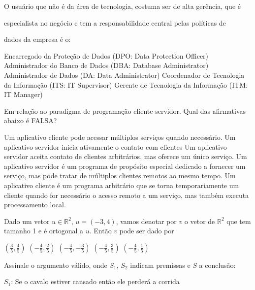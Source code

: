 \documentclass[12pt, addpoints]{exam}
\begin{document}
\begin{questions}
\question

O usuário que não é da área de tecnologia, costuma ser de alta gerência, que é

especialista no negócio e tem a responsabilidade central pelas políticas de

dados da empresa é o:
\begin{choices}
\choice Encarregado da Proteção de Dados (DPO: Data Protection Officer)
\choice Administrador do Banco de Dados (DBA: Database Administrator)
\choice Administrador de Dados (DA: Data Administrator)
\choice Coordenador de Tecnologia da Informação (ITS: IT Supervisor)
\choice Gerente de Tecnologia da Informação (ITM: IT Manager)
\end{choices}

\question

Em relação ao paradigma de programação cliente-servidor. Qual das afirmativas abaixo é FALSA?
\begin{choices}
\choice Um aplicativo cliente pode acessar múltiplos serviços quando necessário.
\choice Um aplicativo servidor inicia ativamente o contato com clientes 
\choice Um aplicativo servidor aceita contato de clientes arbitrários, mas oferece um único serviço. 
\choice Um aplicativo servidor é um programa de propósito especial dedicado a fornecer um serviço, mas pode tratar de múltiplos clientes remotos ao mesmo tempo. 
\choice Um aplicativo cliente é um programa arbitrário que se torna temporariamente um cliente quando for necessário o acesso remoto a um serviço, mas também executa processamento local.
\end{choices}

\question

Dado um vetor \( u \in \mathbb{R}^2 \), \( u = (-3, 4) \), vamos denotar por \( v \) o vetor de \( \mathbb{R}^2 \) que tem tamanho 1 e é ortogonal a \( u \). Então \( v \) pode ser dado por


\begin{choices}
\choice \( \left( \frac{3}{5}, \frac{4}{5} \right) \)
\choice \( \left( -\frac{4}{5}, \frac{2}{5} \right) \)
\choice \( \left( -\frac{4}{5}, -\frac{3}{5} \right) \)
\choice \( \left( -\frac{4}{5}, \frac{3}{5} \right) \)
\choice \( \left( -\frac{4}{5}, \frac{1}{5} \right) \)
\end{choices}

\question

Assinale o argumento válido, onde \( S_1 \), \( S_2 \) indicam premissas e \( S \) a conclusão:


\begin{choices}
\choice \( S_1 \): Se o cavalo estiver cansado então ele perderá a corrida \\


\end{choices}
\end{questions}
\end{document}
